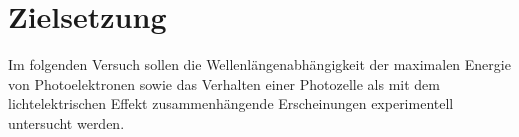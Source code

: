 \section{Zielsetzung}
\label{sec:zielsetzung}

Im folgenden Versuch sollen die Wellenlängenabhängigkeit der maximalen Energie von Photoelektronen sowie das Verhalten einer Photozelle als
mit dem lichtelektrischen Effekt zusammenhängende Erscheinungen experimentell untersucht werden.
